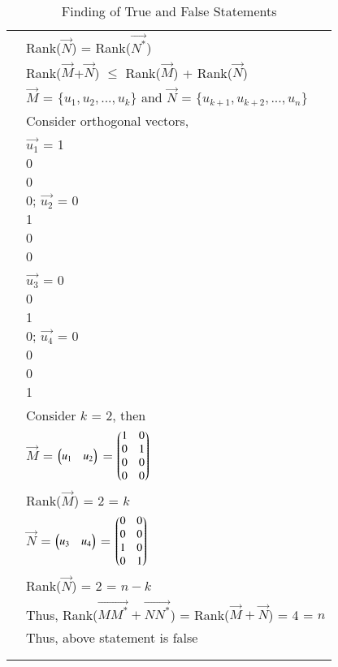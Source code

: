 \documentclass[journal,12pt]{IEEEtran}
\begin{document}
\begin{longtable}{|c|l|}
	& Rank($\vec{N}$) = Rank($\vec{N^*}$)\\
	& Rank($\vec{M}$+$\vec{N}$) $\le$ Rank($\vec{M}$) + Rank($\vec{N}$)\\
	& $\vec{M}$ = $\{u_1,u_2,...,u_k\}$ and $\vec{N}$ = $\{u_{k+1},u_{k+2},...,u_n\}$ \\
	& Consider orthogonal vectors,\\
	& $\vec{u_1}$ = \myvec{1\\0\\0\\0}; $\vec{u_2}$ = \myvec{0\\1\\0\\0}\\
	& $\vec{u_3}$ = \myvec{0\\0\\1\\0}; $\vec{u_4}$ = \myvec{0\\0\\0\\1}\\
	& Consider $k$ = 2, then \\
	& $\vec{M}$ = $\begin{pmatrix}u_1&u_2\end{pmatrix}$ = $\begin{pmatrix}1&0\\0&1\\0&0\\0&0\end{pmatrix}$\\
	& Rank($\vec{M}$) = $2$ = $k$\\
	& $\vec{N}$ = $\begin{pmatrix}u_3&u_4\end{pmatrix}$ = $\begin{pmatrix}0&0\\0&0\\1&0\\0&1\end{pmatrix}$\\
	& Rank($\vec{N}$) = $2$ = $n-k$\\
	& Thus, Rank($\vec{M{M}^*}+\vec{N{N}^*}$) = Rank($\vec{M}+\vec{N}$) = 4 = $n$\\
	& Thus, above statement is false \\
	&\\
	\hline
	\caption{Finding of True and False Statements}
    \label{table:2}
\end{longtable}
\end{document}
